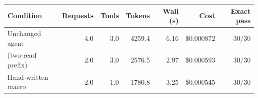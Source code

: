 \begin{tabular}{lrrrrrr}
\toprule
Condition & Requests & Tools & Tokens & Wall (s) & Cost & Exact pass \\
\midrule
Unchanged agent & 4.0 & 3.0 & 4259.4 & 6.16 & \$0.000872 & 30/30 \\
\method{} (two-read prefix) & 2.0 & 3.0 & 2576.5 & 2.97 & \$0.000593 & 30/30 \\
Hand-written macro & 2.0 & 1.0 & 1780.8 & 3.25 & \$0.000545 & 30/30 \\
\bottomrule
\end{tabular}
